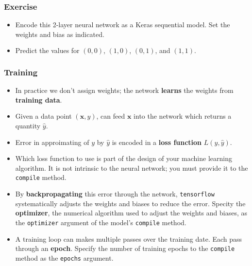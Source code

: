 \documentclass[11pt]{article}
\providecommand{\tightlist}{%
      \setlength{\itemsep}{0pt}\setlength{\parskip}{0pt}}
\begin{document}
    \subsubsection{Exercise}\label{exercise}

\begin{itemize}
\tightlist
\item
  Encode this 2-layer neural network as a Keras sequential model. Set
  the weights and bias as indicated.
\item
  Predict the values for \((0, 0)\), \((1, 0)\), \((0, 1)\), and
  \((1, 1)\).
\end{itemize}

    \subsubsection{Training}\label{training}

\begin{itemize}
\tightlist
\item
  In practice we don't assign weights; the network \textbf{learns} the
  weights from \textbf{training data}.
\item
  Given a data point \((\boldsymbol{x}, y)\), can feed
  \(\boldsymbol{x}\) into the network which returns a quantity
  \(\widehat y\).
\item
  Error in approimating of \(y\) by \(\widehat y\) is encoded in a
  \textbf{loss function} \(L(y, \widehat{y})\).
\item
  Which loss function to use is part of the design of your machine
  learning algorithm. It is not intrinsic to the neural network; you
  must provide it to the \texttt{compile} method.
\item
  By \textbf{backpropagating} this error through the network,
  \texttt{tensorflow} systematically adjusts the weights and biases to
  reduce the error. Specity the \textbf{optimizer}, the numerical
  algorithm used to adjust the weights and biases, as the
  \texttt{optimizer} argument of the model's \texttt{compile} method.
\item
  A training loop can makes multiple passes over the training date. Each
  pass through an \textbf{epoch}. Specify the number of training epochs
  to the \texttt{compile} method as the \texttt{epochs} argument.
\end{itemize}
\end{document}

